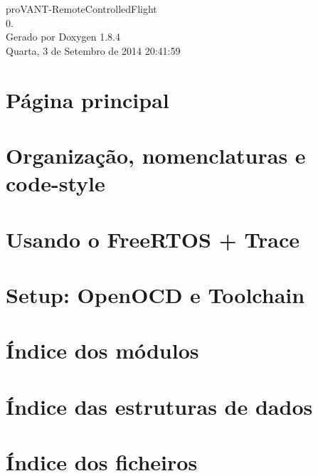 \documentclass[twoside]{book}
\newcommand{\clearemptydoublepage}{%
  \newpage{\pagestyle{empty}\cleardoublepage}%
}
\begin{document}
\hypersetup{pageanchor=false}
\begin{titlepage}
\vspace*{7cm}
\begin{center}%
{\Large pro\-V\-A\-N\-T-\/\-Remote\-Controlled\-Flight \\[1ex]\large 0. }\\
\vspace*{1cm}
{\large Gerado por Doxygen 1.8.4}\\
\vspace*{0.5cm}
{\small Quarta, 3 de Setembro de 2014 20:41:59}\\
\end{center}
\end{titlepage}
\clearemptydoublepage
\tableofcontents
\clearemptydoublepage
{}
\hypersetup{pageanchor=true}

\chapter{Página principal}
\label{index}\hypertarget{index}{}
\chapter{Organização, nomenclaturas e code-\/style}
\label{page_naming}
\hypertarget{page_naming}{}

\chapter{Usando o Free\-R\-T\-O\-S + Trace}
\label{page_freertosplustrace}
\hypertarget{page_freertosplustrace}{}

\chapter{Setup\-: Open\-O\-C\-D e Toolchain}
\label{page_setup}
\hypertarget{page_setup}{}

\chapter{Índice dos módulos}

\chapter{Índice das estruturas de dados}

\chapter{Índice dos ficheiros}

\end{document}

